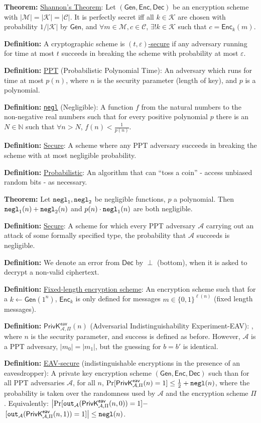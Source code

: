 \documentclass[12pt]{article}
\newcommand{\N}{\mathbb{N}}
\newcommand{\AAA}{\mathcal{A}}
\newcommand{\CCC}{\mathcal{C}}
\newcommand{\KKK}{\mathcal{K}}
\newcommand{\MMM}{\mathcal{M}}
\newcommand{\defn}[1]{{\bf Definition:} \underline{#1}}
\newcommand{\thm}[1]{{\bf Theorem:} \underline{#1}}
\newcommand{\Enc}{\mathsf{Enc}}
\newcommand{\Dec}{\mathsf{Dec}}
\newcommand{\Gen}{\mathsf{Gen}}
\newcommand{\GenEncDec}{(\Gen,\Enc,\Dec)}
\newcommand{\ExptEavArgs}[2]{\mathsf{PrivK}^{\mathsf{eav}}_{#1,#2}}
\newcommand{\ExptEav}{\ExptEavArgs{\AAA}{\Pi}}
\newcommand{\negl}{{\tt negl}}
\newcommand{\from}{\leftarrow}
\begin{document}
\begin{multicols}{3}
\thm{Shannon's Theorem}: Let $\GenEncDec$ be an encryption scheme with $|\MMM|=|\KKK|=|\CCC|$. It is perfectly secret iff all $k\in\KKK$ are chosen with probability $1/|\KKK|$ by $\Gen$, and $\forall m\in\MMM, c\in\CCC$, $\exists!k\in\KKK$ such that $c=\Enc_k(m)$.

\defn{}A cryptographic scheme is \underline{$(t,\varepsilon)$-secure} if any adversary running for time at most $t$ succeeds in breaking the scheme with probability at most $\varepsilon$.

\defn{PPT} (Probabilistic Polynomial Time): An adversary which runs for time at most $p(n)$, where $n$ is the security parameter (length of key), and $p$ is a polynomial.

\defn{\negl} (Negligible): A function $f$ from the natural numbers to the non-negative real numbers such that for every positive polynomial $p$ there is an $N\in\N$ such that $\forall n>N$, $f(n)<\frac{1}{p(n)}$.

\defn{Secure}: A scheme where any PPT adversary succeeds in breaking the scheme with at most negligible probability.

\defn{Probabilistic}: An algorithm that can ``toss a coin'' - access unbiased random bits - as necessary.

\thm{}Let $\negl_1,\negl_2$ be negligible functions, $p$ a polynomial. Then $\negl_1(n)+\negl_2(n)$ and $p(n)\cdot\negl_1(n)$ are both negligible.

\defn{Secure}: A scheme for which every PPT adversary $\AAA$ carrying out an attack of some formally specified type, the probability that $\AAA$ succeeds is negligible.

\defn{}We denote an error from $\Dec$ by $\perp$ (bottom), when it is asked to decrypt a non-valid ciphertext.

\defn{Fixed-length encryption scheme}: An encryption scheme such that for a $k\from\Gen(1^n)$, $\Enc_k$ is only defined for messages $m\in\{0,1\}^{\ell(n)}$ (fixed length messages).

\defn{$\ExptEav(n)$} (Adversarial Indistinguishability Experiment-EAV): , where $n$ is the security parameter, and success is defined as before. However, $\AAA$ is a PPT adversary, $|m_0|=|m_1|$, but the guessing for $b=b'$ is identical.

\defn{EAV-secure} (indistinguishable encryptions in the presence of an eavesdropper): A private key encryption scheme $\GenEncDec$ such than for all PPT adversaries $\AAA$, for all $n$, $\Pr[\ExptEav(n)=1]\leq\frac{1}{2}+\negl(n)$, where the probability is taken over the randomness used by $\AAA$ and the encryption scheme $\Pi$. Equivalently: $\left|\Pr[{\tt out}_{\AAA}(\ExptEav(n,0))=1]-\right.$ $\left.[{\tt out}_{\AAA}(\ExptEav(n,1))=1]\right|\leq\negl(n)$.


\end{multicols}
\end{document}
